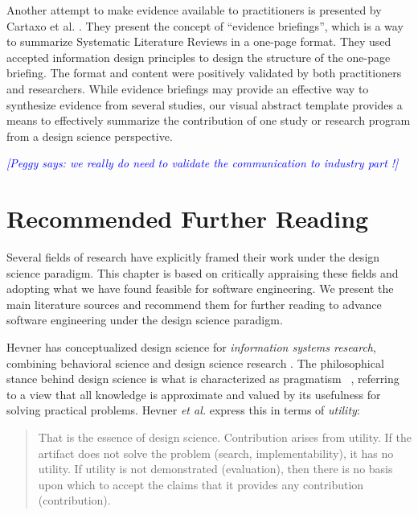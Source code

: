 \documentclass[graybox]{svmult}
\newcommand{\emelie}[1]{\textcolor{red}{{\it [Emelie says: #1]}}}
\newcommand{\peggy}[1]{\textcolor{blue}{{\it [Peggy says: #1]}}}
\newcommand{\emelie}[1]{}
\newcommand{\peggy}[1]{}
\begin{document}
Another attempt to make evidence available to practitioners is presented by Cartaxo et al. \cite{Cartaxo2016}. 
They present the concept of ``evidence briefings'', which is a way to summarize Systematic Literature Reviews in a one-page format. 
They used accepted information design principles to design the structure of the one-page briefing. The format and content were positively validated by both practitioners and researchers. While evidence briefings may provide an effective way to synthesize evidence from several studies, our visual abstract template provides a means to effectively summarize the contribution of one study or research program from a design science perspective.

\peggy{we really do need to validate the communication to industry part !}



\section{Recommended Further Reading}
\label{sec:reading}
Several fields of research have explicitly framed their work under the design science paradigm. This chapter is based on critically appraising these fields and adopting what we have found feasible for software engineering. We present the main literature sources and recommend them for further reading to advance software engineering under the design science paradigm.

Hevner has conceptualized design science for \emph{information systems research}, combining behavioral science and design science research \cite{hevner_design_2004,hevner_design_2010}.
The philosophical stance behind design science is what is characterized as pragmatism~\cite{easterbrook_selecting_2008}%
, referring to a view that all knowledge is approximate and valued by its usefulness for solving practical problems. Hevner \emph{et al.} express this in terms of \emph{utility}: 

\begin{quote}
	That is the essence of design science. Contribution arises from utility. If the artifact does not solve the problem (search, implementability), it has no utility. If utility is not demonstrated (evaluation), then there is no basis upon which to accept the claims that it provides any contribution (contribution).~\cite[p. 91]{hevner_design_2004}
\end{quote}
\end{document}
